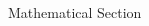 \documentclass[final,hyperref={pdfpagelabels=false}]{beamer}
\begin{document}
\begin{frame}[t]
\begin{columns}[t]
\begin{column}{.465\textwidth}
\begin{block}{Mathematical Section}
\end{block}


\end{column} %

\begin{column}{.015\textwidth}\end{column} %

\end{columns} %

\end{frame} %
\end{document}

